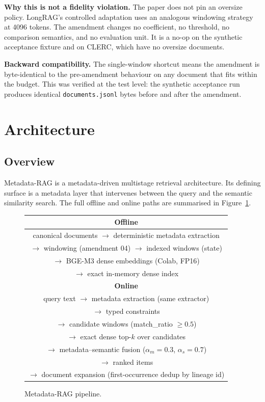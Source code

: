 \documentclass[11pt,a4paper]{article}
\begin{document}
\textbf{Why this is not a fidelity violation.} The paper does not
pin an oversize policy. LongRAG's controlled adaptation uses an
analogous windowing strategy at \num{4096} tokens. The amendment
changes no coefficient, no threshold, no comparison semantics, and
no evaluation unit. It is a no-op on the synthetic acceptance
fixture and on CLERC, which have no oversize documents.

\textbf{Backward compatibility.} The single-window shortcut means
the amendment is byte-identical to the pre-amendment behaviour on
any document that fits within the budget. This was verified at the
test level: the synthetic acceptance run produces identical
\texttt{documents.jsonl} bytes before and after the amendment.

\section{Architecture}\label{sec:arch}

\subsection{Overview}
Metadata-RAG is a metadata-driven multistage retrieval architecture.
Its defining surface is a metadata layer that intervenes between the
query and the semantic similarity search. The full offline and online
paths are summarised in Figure~\ref{fig:pipeline}.

\begin{figure}[h]
\centering
\small
\begin{tabular}{c}
\hline
\textbf{Offline}\\
\hline
canonical documents $\to$ deterministic metadata extraction\\
$\to$ windowing (amendment 04) $\to$ indexed windows (state)\\
$\to$ BGE-M3 dense embeddings (Colab, FP16)\\
$\to$ exact in-memory dense index\\
\hline
\textbf{Online}\\
\hline
query text $\to$ metadata extraction (same extractor)\\
$\to$ typed constraints\\
$\to$ candidate windows (match\_ratio $\geq 0.5$)\\
$\to$ exact dense top-$k$ over candidates\\
$\to$ metadata--semantic fusion ($\alpha_m=0.3$, $\alpha_s=0.7$)\\
$\to$ ranked items\\
$\to$ document expansion (first-occurrence dedup by lineage id)\\
\hline
\end{tabular}
\caption{Metadata-RAG pipeline.}
\label{fig:pipeline}
\end{figure}
\end{document}
